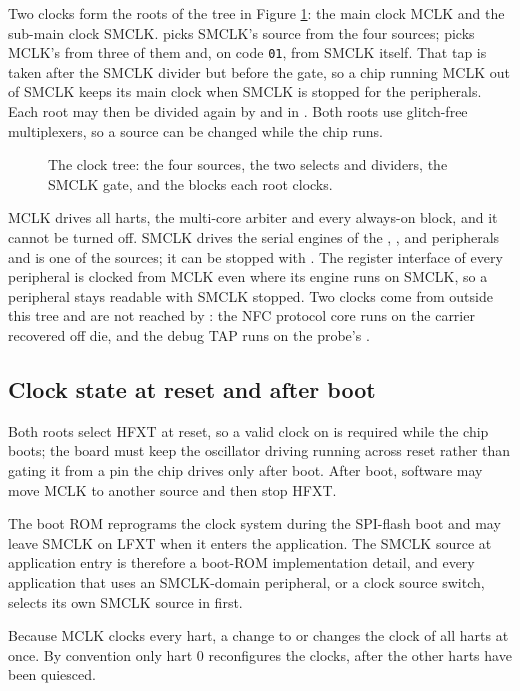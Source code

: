 Two clocks form the roots of the tree in Figure \ref{fig:mcu-clock-system}: the main clock MCLK and the sub-main clock SMCLK.  picks SMCLK's source from the four sources;  picks MCLK's from three of them and, on code \texttt{01}, from SMCLK itself. That tap is taken after the SMCLK divider but before the  gate, so a chip running MCLK out of SMCLK keeps its main clock when SMCLK is stopped for the peripherals. Each root may then be divided again by  and  in . Both roots use glitch-free multiplexers, so a source can be changed while the chip runs.

\begin{figure}[htpb]
	\centering
	
	\caption{The clock tree: the four sources, the two selects and dividers, the SMCLK gate, and the blocks each root clocks.}
	\label{fig:mcu-clock-system}
\end{figure}

MCLK drives all \NumHartsWord{} harts, the multi-core arbiter and every always-on block, and it cannot be turned off. SMCLK drives the serial engines of the , ,  and  peripherals and is one of the  sources; it can be stopped with . The register interface of every peripheral is clocked from MCLK even where its engine runs on SMCLK, so a peripheral stays readable with SMCLK stopped. Two clocks come from outside this tree and are not reached by : the NFC protocol core runs on the carrier recovered off die, and the debug TAP runs on the probe's .

\subsection{Clock state at reset and after boot}

Both roots select HFXT at reset, so a valid clock on  is required while the chip boots; the board must keep the oscillator driving  running across reset rather than gating it from a pin the chip drives only after boot. After boot, software may move MCLK to another source and then stop HFXT.

The boot ROM reprograms the clock system during the SPI-flash boot and may leave SMCLK on LFXT when it enters the application. The SMCLK source at application entry is therefore a boot-ROM implementation detail, and every application that uses an SMCLK-domain peripheral, or a  clock source switch, selects its own SMCLK source in  first.

Because MCLK clocks every hart, a change to  or  changes the clock of all \NumHartsWord{} harts at once. By convention only hart 0 reconfigures the clocks, after the other harts have been quiesced.

